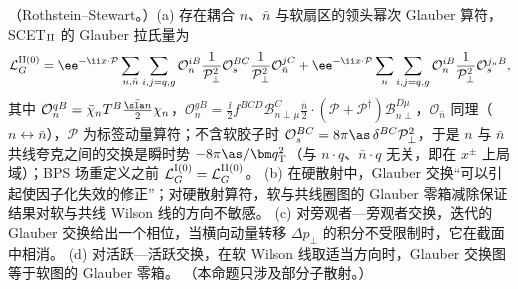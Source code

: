 \begin{proposition}\label{prop:scet-glauber-operators}
（Rothstein--Stewart\cite{RothsteinStewart2016}。）(a) 存在耦合 $n$、$\bar n$ 与软扇区的领头幂次 Glauber 算符，SCET$_{\rm II}$ 的 Glauber 拉氏量为\cite[式~(5.21)]{RothsteinStewart2016}
\begin{equation}\label{eq:scet-LG}
\mathcal L_G^{\rm II(0)}=\ee^{-\ii x\cdot\mathcal P}\sum_{n,\bar n}\sum_{i,j=q,g}\mathcal O_n^{iB}\frac{1}{\mathcal P_\perp^2}\mathcal O_s^{BC}\frac{1}{\mathcal P_\perp^2}\mathcal O_{\bar n}^{jC}
+\ee^{-\ii x\cdot\mathcal P}\sum_n\sum_{i,j=q,g}\mathcal O_n^{iB}\frac{1}{\mathcal P_\perp^2}\mathcal O_s^{j_nB},
\end{equation}
其中 $\mathcal O_n^{qB}=\bar\chi_nT^B\frac{\bar{\sla n}}{2}\chi_n$，$\mathcal O_n^{gB}=\frac\ii2f^{BCD}\mathcal B^C_{n\perp\mu}\frac{\bar n}{2}\cdot(\mathcal P+\mathcal P^\dagger)\mathcal B^{D\mu}_{n\perp}$，$\mathcal O_{\bar n}$ 同理（$n\leftrightarrow\bar n$），$\mathcal P$ 为标签动量算符；不含软胶子时 $\mathcal O_s^{BC}=8\pi\as\,\delta^{BC}\mathcal P_\perp^2$，于是 $n$ 与 $\bar n$ 共线夸克之间的交换是瞬时势 $-8\pi\as/\bm q_{\mathrm T}^2$（与 $n\cdot q$、$\bar n\cdot q$ 无关，即在 $x^\pm$ 上局域）；BPS 场重定义之前 $\mathcal L_G^{\rm I(0)}=\mathcal L_G^{\rm II(0)}$。
(b) 在硬散射中，Glauber 交换“可以引起使因子化失效的修正”；对硬散射算符，软与共线圈图的 Glauber 零箱减除保证结果对软与共线 Wilson 线的方向不敏感。
(c) 对旁观者—旁观者交换，迭代的 Glauber 交换给出一个相位，当横向动量转移 $\Delta p_\perp$ 的积分不受限制时，它在截面中相消。
(d) 对活跃—活跃交换，在软 Wilson 线取适当方向时，Glauber 交换图等于软图的 Glauber 零箱\cite[第~10.1~节]{RothsteinStewart2016}。
（本命题只涉及部分子散射。）
\end{proposition}

